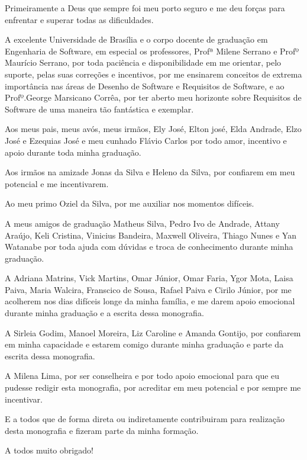 \begin{agradecimentos}

	Primeiramente a Deus que sempre foi meu porto seguro e me deu forças para enfrentar e superar todas as dificuldades.
	 
	A excelente Universidade de Brasília e o corpo docente de graduação em Engenharia de Software, em especial os professores, Profª Milene Serrano e Profº Maurício Serrano, por toda paciência e disponibilidade em me orientar, pelo suporte, pelas suas correções e incentivos, por me ensinarem conceitos de extrema importância nas áreas de Desenho de Software e Requisitos de Software, e ao Profº.George Marsicano Corrêa, por ter aberto meu horizonte sobre Requisitos de Software de uma maneira tão fantástica e exemplar.
	
	Aos meus pais, meus avós, meus irmãos, Ely José, Elton josé, Elda Andrade, Elzo José e Ezequias José e meu cunhado Flávio Carlos por todo amor, incentivo e apoio durante toda minha graduação. 
	
	Aos irmãos na amizade Jonas da Silva e Heleno da Silva, por confiarem em meu potencial e me incentivarem. 
	
	Ao meu primo Oziel da Silva, por me auxiliar nos momentos difíceis. 
	
	A meus amigos de graduação Matheus Silva, Pedro Ivo de Andrade, Attany Araújo, Keli Cristina, Vinicius Bandeira, Maxwell Oliveira, Thiago Nunes e Yan Watanabe por toda ajuda com dúvidas e troca de conhecimento durante minha graduação. 
	
	A Adriana Matrins, Vick Martins, Omar Júnior, Omar Faria, Ygor Mota, Laisa Paiva, Maria Walcira, Franscico de Sousa, Rafael Paiva e Cirilo Júnior, por me acolherem nos dias difíceis longe da minha família,  e me darem apoio emocional durante minha graduação e a escrita dessa monografia. 
	
	A Sirleia Godim, Manoel Moreira, Liz Caroline e Amanda Gontijo, por confiarem em minha capacidade e estarem comigo durante minha graduação e parte da escrita dessa monografia. 
	
	A Milena Lima, por ser conselheira e por todo apoio emocional para que eu pudesse redigir esta monografia, por acreditar em meu potencial e por sempre me incentivar.
	
	E a todos que de forma direta ou indiretamente contribuiram para realização desta monografia e fizeram parte da minha formação. 
	
	A todos muito obrigado!  
	
	

\end{agradecimentos}
